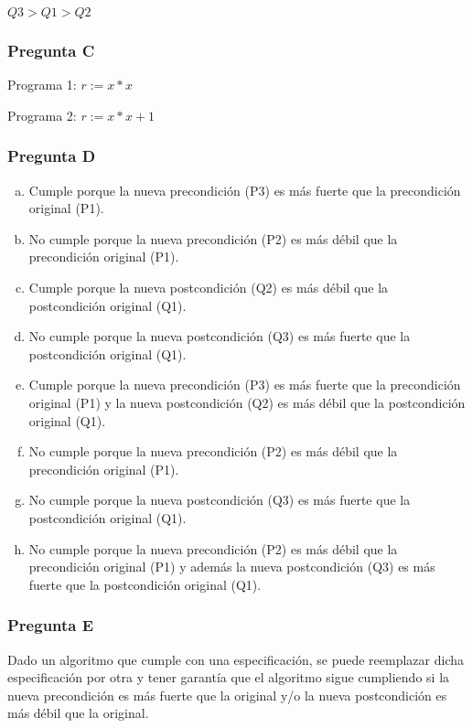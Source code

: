 $Q3 > Q1 > Q2$

\subsubsection{Pregunta C}

Programa 1: $r := x * x$

Programa 2: $r := x * x + 1$

\subsubsection{Pregunta D}

\begin{enumerate}[a)]
    \item Cumple porque la nueva precondición (P3) es más fuerte que la precondición original (P1).
    \item No cumple porque la nueva precondición (P2) es más débil que la precondición original (P1).
    \item Cumple porque la nueva postcondición (Q2) es más débil que la postcondición original (Q1).
    \item No cumple porque la nueva postcondición (Q3) es más fuerte que la postcondición original (Q1).
    \item Cumple porque la nueva precondición (P3) es más fuerte que la precondición original (P1) y la nueva postcondición (Q2) es más débil que la postcondición original (Q1).
    \item No cumple porque la nueva precondición (P2) es más débil que la precondición original (P1).
    \item No cumple porque la nueva postcondición (Q3) es más fuerte que la postcondición original (Q1).
    \item No cumple porque la nueva precondición (P2) es más débil que la precondición original (P1) y además la nueva postcondición (Q3) es más fuerte que la postcondición original (Q1).
\end{enumerate}

\subsubsection{Pregunta E}

Dado un algoritmo que cumple con una especificación, se puede reemplazar dicha especificación por otra y tener garantía que el algoritmo sigue cumpliendo si la nueva precondición es más fuerte que la original y/o la nueva postcondición es más débil que la original.

